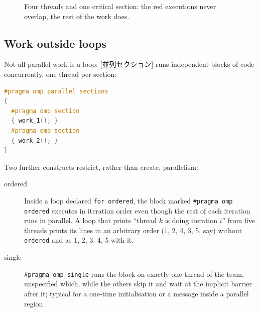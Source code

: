 \documentclass[../main.tex]{subfiles}
\begin{document}
\begin{figure}[tb]
  \centering
  
  \caption{Four threads and one critical section: the red executions never
    overlap, the rest of the work does.}
  \label{fig:l02-critical}
\end{figure}


\subsection{Work outside loops}

Not all parallel work is a loop: [並列セクション]
runs independent blocks of code concurrently, one thread per
section:
\begin{lstlisting}[language=C++, numbers=none]
#pragma omp parallel sections
{
  #pragma omp section
  { work_1(); }
  #pragma omp section
  { work_2(); }
}
\end{lstlisting}
Two further constructs restrict, rather than create, parallelism:
\begin{description}
  \item[ordered]  Inside a loop declared \texttt{for ordered}, the block
    marked \texttt{\#pragma omp ordered} executes in iteration order even
    though the rest of each iteration runs in parallel.  A loop that prints
    \enquote{thread $k$ is doing iteration $i$} from five threads prints
    its lines in an arbitrary order (1, 2, 4, 3, 5, say) without
    \texttt{ordered} and as 1, 2, 3, 4, 5 with it.
  \item[single]  \texttt{\#pragma omp single} runs the block on exactly
    one thread of the team, unspecified which, while the others skip it
    and wait at the implicit barrier after it; typical for a one-time
    initialisation or a message inside a parallel region.
\end{description}
\end{document}
